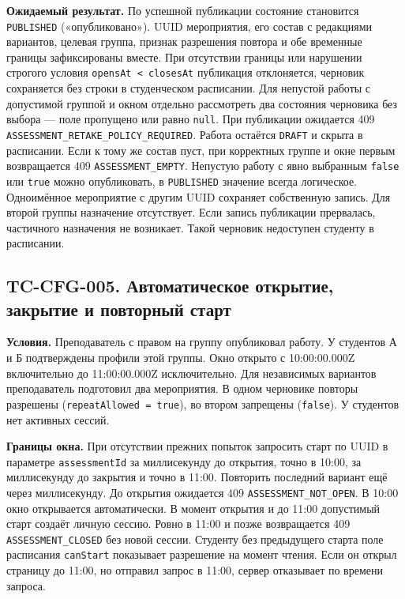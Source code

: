 \documentclass[12pt,a4paper]{article}
\begin{document}
\textbf{Ожидаемый результат.} По успешной публикации состояние становится \texttt{PUBLISHED} («опубликовано»). UUID мероприятия, его состав с редакциями вариантов, целевая группа, признак разрешения повтора и обе временные границы зафиксированы вместе. При отсутствии границы или нарушении строгого условия \texttt{opens\allowbreak{}At < closes\allowbreak{}At} публикация отклоняется, черновик сохраняется без строки в студенческом расписании. Для непустой работы с допустимой группой и окном отдельно рассмотреть два состояния черновика без выбора --- поле пропущено или равно \texttt{null}. При публикации ожидается 409 \texttt{ASSESSMENT\_\allowbreak{}RETAKE\_\allowbreak{}POLICY\_\allowbreak{}REQUIRED}. Работа остаётся \texttt{DRAFT} и скрыта в расписании. Если к тому же состав пуст, при корректных группе и окне первым возвращается 409 \texttt{ASSESSMENT\_\allowbreak{}EMPTY}. Непустую работу с явно выбранным \texttt{false} или \texttt{true} можно опубликовать, в \texttt{PUBLISHED} значение всегда логическое. Одноимённое мероприятие с другим UUID сохраняет собственную запись. Для второй группы назначение отсутствует. Если запись публикации прервалась, частичного назначения не возникает. Такой черновик недоступен студенту в расписании.

\subsection{TC-CFG-005. Автоматическое открытие, закрытие и повторный старт}\label{tc-cfg-005-ux430ux432ux442ux43eux43cux430ux442ux438ux447ux435ux441ux43aux43eux435-ux43eux442ux43aux440ux44bux442ux438ux435-ux437ux430ux43aux440ux44bux442ux438ux435-ux438-ux43fux43eux432ux442ux43eux440ux43dux44bux439-ux441ux442ux430ux440ux442}

\hypertarget{tc-cfg-005-автоматическое-открытие-закрытие-и-повторный-старт}{}

\hypertarget{tc-cfg-005}{}

\textbf{Условия.} Преподаватель с правом на группу опубликовал работу. У студентов А и Б подтверждены профили этой группы. Окно открыто с 10:00:00.000Z включительно до 11:00:00.000Z исключительно. Для независимых вариантов преподаватель подготовил два мероприятия. В одном черновике повторы разрешены (\texttt{repeat\allowbreak{}Allowed =\allowbreak{} true}), во втором запрещены (\texttt{false}). У студентов нет активных сессий.

\textbf{Границы окна.} При отсутствии прежних попыток запросить старт по UUID в параметре \texttt{assessment\allowbreak{}Id} за миллисекунду до открытия, точно в 10:00, за миллисекунду до закрытия и точно в 11:00. Повторить последний вариант ещё через миллисекунду. До открытия ожидается 409 \texttt{ASSESSMENT\_\allowbreak{}NOT\_\allowbreak{}OPEN}. В 10:00 окно открывается автоматически. В момент открытия и до 11:00 допустимый старт создаёт личную сессию. Ровно в 11:00 и позже возвращается 409 \texttt{ASSESSMENT\_\allowbreak{}CLOSED} без новой сессии. Студенту без предыдущего старта поле расписания \texttt{canStart} показывает разрешение на момент чтения. Если он открыл страницу до 11:00, но отправил запрос в 11:00, сервер отказывает по времени запроса.
\end{document}
